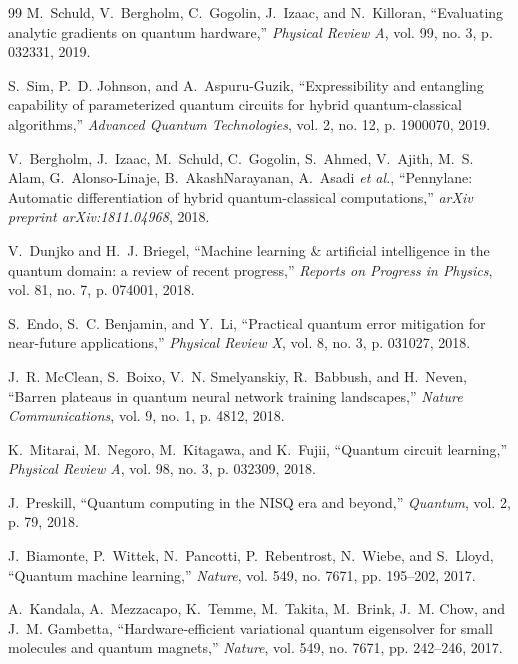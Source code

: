 \documentclass[journal]{IEEEtran}
\begin{document}
\begin{thebibliography}{99}
M.~Schuld, V.~Bergholm, C.~Gogolin, J.~Izaac, and N.~Killoran,
``Evaluating analytic gradients on quantum hardware,'' \emph{Physical Review A}, vol. 99, no. 3, p. 032331, 2019.

S.~Sim, P.~D. Johnson, and A.~Aspuru-Guzik,
``Expressibility and entangling capability of parameterized quantum circuits for hybrid quantum-classical algorithms,'' \emph{Advanced Quantum Technologies}, vol. 2, no. 12, p. 1900070, 2019.

V.~Bergholm, J.~Izaac, M.~Schuld, C.~Gogolin, S.~Ahmed, V.~Ajith, M.~S. Alam, G.~Alonso-Linaje, B.~AkashNarayanan, A.~Asadi \emph{et al.},
``Pennylane: Automatic differentiation of hybrid quantum-classical computations,'' \emph{arXiv preprint arXiv:1811.04968}, 2018.

V.~Dunjko and H.~J. Briegel,
``Machine learning \& artificial intelligence in the quantum domain: a review of recent progress,'' \emph{Reports on Progress in Physics}, vol. 81, no. 7, p. 074001, 2018.

S.~Endo, S.~C. Benjamin, and Y.~Li,
``Practical quantum error mitigation for near-future applications,'' \emph{Physical Review X}, vol. 8, no. 3, p. 031027, 2018.

J.~R. McClean, S.~Boixo, V.~N. Smelyanskiy, R.~Babbush, and H.~Neven,
``Barren plateaus in quantum neural network training landscapes,'' \emph{Nature Communications}, vol. 9, no. 1, p. 4812, 2018.

K.~Mitarai, M.~Negoro, M.~Kitagawa, and K.~Fujii,
``Quantum circuit learning,'' \emph{Physical Review A}, vol. 98, no. 3, p. 032309, 2018.

J.~Preskill,
``Quantum computing in the NISQ era and beyond,'' \emph{Quantum}, vol. 2, p. 79, 2018.

J.~Biamonte, P.~Wittek, N.~Pancotti, P.~Rebentrost, N.~Wiebe, and S.~Lloyd,
``Quantum machine learning,'' \emph{Nature}, vol. 549, no. 7671, pp. 195--202, 2017.

A.~Kandala, A.~Mezzacapo, K.~Temme, M.~Takita, M.~Brink, J.~M. Chow, and J.~M. Gambetta,
``Hardware-efficient variational quantum eigensolver for small molecules and quantum magnets,'' \emph{Nature}, vol. 549, no. 7671, pp. 242--246, 2017.


\end{thebibliography}
\end{document}
